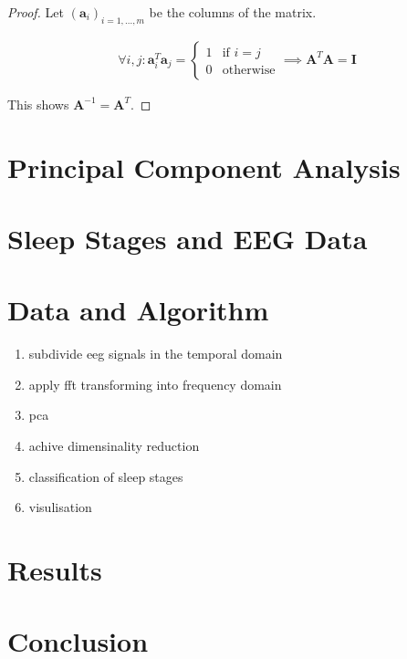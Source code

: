 \documentclass[a4paper]{IEEEtran}
\begin{document}
\begin{proof}
	Let $(\mathbf{a}_i)_{i=1,...,m}$ be the columns of the matrix.
	
	\begin{align*}
		\forall i,j: \mathbf{a}_i^T\mathbf{a}_j = \begin{cases}
			1 & \text{if } i=j\\
			0 & \text{otherwise}
		\end{cases} \implies \mathbf{A}^T\mathbf{A} = \mathbf{I}
	\end{align*}
	
	This shows $\mathbf{A}^{-1} = \mathbf{A}^T$.
\end{proof}

\section{Principal Component Analysis}
\label{sec:principal_component_analysis}

\section{Sleep Stages and EEG Data}
\label{sec:sleep_stages_and_eeg_data}

\section{Data and Algorithm}
\label{sec:data_and_algorithm}

\begin{enumerate}
	\item subdivide eeg signals in the temporal domain
	\item apply fft transforming into frequency domain
	\item pca
	\item achive dimensinality reduction
	\item classification of sleep stages
	\item visulisation
\end{enumerate}

\section{Results}
\label{sec:results}

\section{Conclusion}
\label{sec:conclusion}



\end{document}
